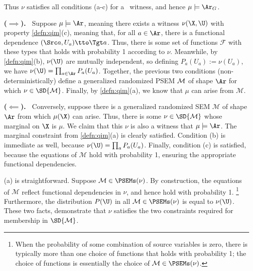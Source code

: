 \begin{subappendices}
\begin{lproof}
    
    Thus $\nu$ satisfies all conditions (a-c) for a \scibility\ witness, and hence $\mu \models \Ar_G$. 
\end{lproof}



\begin{lproof}\label{proof:gen-sim-compat-means-arise}
    \textbf{($\implies$).~} Suppose $\mu \models \Ar$, meaning there exists a witness
    $\nu(\X,\U)$ with property \cref{defn:qim}(c), meaning
    that, for all $a \in \Ar$, 
    there is a functional dependence $(\Src a, U_a) \tto \Tgt a$.
    Thus, there is some set of functions $\mathcal F$ with these types that holds with probability 1 according to $\nu$. 
    Meanwhile, by \cref{defn:qim}(b), $\nu(\U)$ are mutually independent, so defining $P_a(U_a) := \nu(U_a)$, we have $\nu(\U) = \prod_{a \in \Ar}P_a(U_a)$. 
    Together, the previous two conditions (non-deterministically) define a 
    generalized randomized PSEM
    $\cal M$ of shape $\Ar$ for which $\nu \in \SD{\mathcal M}$. 
    Finally, by \cref{defn:qim}(a), we know that $\mu$ can arise from $\mathcal M$.
    
    \textbf{($\impliedby$).~} Conversely, suppose there is a generalized randomized SEM $\mathcal M$ of shape $\Ar$ from which $\mu(\X)$ can arise. 
    Thus, there is some $\nu \in \SD{\mathcal M}$ whose marginal on $\X$ is $\mu$. 
    We claim that this $\nu$ is also a witness that $\mu \models \Ar$.
    The marginal constraint from \cref{defn:qim}(a) is clearly satisfied. 
    Condition (b) is immediate as well, because $\nu(\U) = \prod_{a} P_a(U_a)$. 
    Finally, condition (c) is satisfied, because the equations of $\mathcal M$ hold with probability 1, ensuring the appropriate functional dependencies. 
\end{lproof}

\begin{lproof}\label{proof:witness-model-properties}
    (a) is straightforward. 
    Suppose $\mathcal M \in \PSEMs(\nu)$. 
    By construction, the equations of $\mathcal M$ reflect functional dependencies in $\nu$, and hence hold with probability 1. 
    \unskip\footnote{When the probability of some combination of source variables is zero, there is typically more than one choice of functions that holds with probability 1; the choice of functions is essentially the choice of $\mathcal M \in \PSEMs(\nu)$.}
    Furthermore, the distribution $P(\U)$ in all $\mathcal M \in \PSEMs(\nu)$ is equal to $\nu(\U)$. 
    These two facts, demonstrate that $\nu$ satisfies the two constraints required for membership in $\SD{\mathcal M}$. 
    

\end{lproof}
\end{subappendices}
